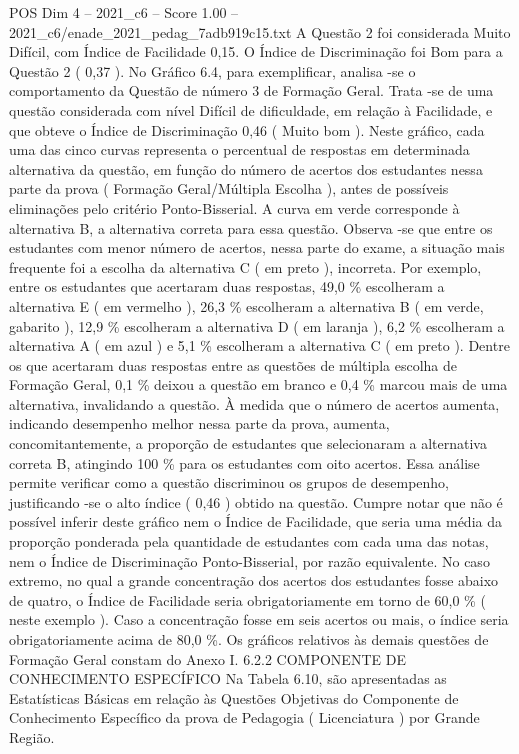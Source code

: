 \begin{textsample}{POS Dim 4 – 2021\_c6 – Score 1.00 – 2021\_c6/enade\_2021\_pedag\_7adb919c15.txt}
A Questão 2 foi considerada Muito Difícil, com Índice de Facilidade 0,15.
O Índice de Discriminação foi Bom para a Questão 2 ( 0,37 ).
No Gráfico 6.4, para exemplificar, analisa -se o comportamento da Questão de número 3 de Formação Geral.
Trata -se de uma questão considerada com nível Difícil de dificuldade, em relação à Facilidade, e que obteve o Índice de Discriminação 0,46 ( Muito bom ).
Neste gráfico, cada uma das cinco curvas representa o percentual de respostas em determinada alternativa da questão, em função do número de acertos dos estudantes nessa parte da prova ( Formação Geral/Múltipla Escolha ), antes de possíveis eliminações pelo critério Ponto-Bisserial.
A curva em verde corresponde à alternativa B, a alternativa correta para essa questão.
Observa -se que entre os estudantes com menor número de acertos, nessa parte do exame, a situação mais frequente foi a escolha da alternativa C ( em preto ), incorreta.
Por exemplo, entre os estudantes que acertaram duas respostas, 49,0 \% escolheram a alternativa E ( em vermelho ), 26,3 \% escolheram a alternativa B ( em verde, gabarito ), 12,9 \% escolheram a alternativa D ( em laranja ), 6,2 \% escolheram a alternativa A ( em azul ) e 5,1 \% escolheram a alternativa C ( em preto ).
Dentre os que acertaram duas respostas entre as questões de múltipla escolha de Formação Geral, 0,1 \% deixou a questão em branco e 0,4 \% marcou mais de uma alternativa, invalidando a questão.
À medida que o número de acertos aumenta, indicando desempenho melhor nessa parte da prova, aumenta, concomitantemente, a proporção de estudantes que selecionaram a alternativa correta B, atingindo 100 \% para os estudantes com oito acertos.
Essa análise permite verificar como a questão discriminou os grupos de desempenho, justificando -se o alto índice ( 0,46 ) obtido na questão.
Cumpre notar que não é possível inferir deste gráfico nem o Índice de Facilidade, que seria uma média da proporção ponderada pela quantidade de estudantes com cada uma das notas, nem o Índice de Discriminação Ponto-Bisserial, por razão equivalente.
No caso extremo, no qual a grande concentração dos acertos dos estudantes fosse abaixo de quatro, o Índice de Facilidade seria obrigatoriamente em torno de 60,0 \% ( neste exemplo ).
Caso a concentração fosse em seis acertos ou mais, o índice seria obrigatoriamente acima de 80,0 \%.
Os gráficos relativos às demais questões de Formação Geral constam do Anexo I. 6.2.2 COMPONENTE DE CONHECIMENTO ESPECÍFICO Na Tabela 6.10, são apresentadas as Estatísticas Básicas em relação às Questões Objetivas do Componente de Conhecimento Específico da prova de Pedagogia ( Licenciatura ) por Grande Região.

\end{textsample}
